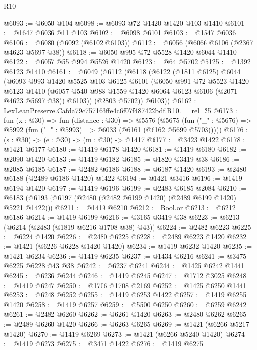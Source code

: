 \begin{lexlean}{R10}
\begin{coremodule}
@6093 := @6050 @104
@6098 := @6093 @72 @1420 @1420 @103 @1410
@6101 := @1647 @6036 @11 @103
@6102 := @6098 @6101
@6103 := @1547 @6036
@6106 := @6080 (@6092 (@6102 @6103))
@6112 := @6056 (@6066 @6106 (@2367 @4623 @5697 @38))
@6118 := @6050 @995 @72 @5528 @1420 @6044 @1410
@6122 := @6057 @55 @994 @5526 @1420
@6123 := @64 @5702
@6125 := @1392 @6123 @1410
@6161 := @6049
    (@6112
      (@6118
        (@6122
          (@1811 @6125)
          @6044
          (@6093
            @993
            @1420
            @5525
            @103
            @6125
            @6101
            (@6050
              @991
              @72
              @5523
              @1420
              @6123
              @1410
              (@6057 @540 @988 @1559 @1420 @6064 @6123 @6106 (@2071 @4623 @5697 @38))
              @6103))
          (@2803 @5702))
        @6103))
@6162 := LexLeanPreserve.Cafda79c757163ffe4c6f07f487422bdf.R10.__rel_25
@6173 := fun (x : @30) =>
  fun (distance : @30) =>
  @5576
    (@5675 (fun ("_" : @5676) => @5992 (fun ("_" : @5993) => @6033 (@6161 (@6162 @5699 @5703)))))
@6176 := (s : @30) -> (e : @30) -> (m : @30) -> @1417
@6177 := @3423 @1422
@6178 := @1421 @6177
@6180 := @1419 @6178 @1420
@6181 := @1419 @6180
@6182 := @2090 @1420
@6183 := @1419 @6182
@6185 := @1820 @3419 @38
@6186 := @2085 @6185
@6187 := @2482 @6186
@6188 := @6187 @1420
@6193 := @2480 @6188 (@2489 @6186 @1420) @1422
@6194 := @1421 @3416
@6196 := @1419 @6194 @1420
@6197 := @1419 @6196
@6199 := @2483 @6185 @2084
@6210 := @6183 (@6193 (@6197 (@2480 (@2482 @6199 @1420) (@2489 @6199 @1420) @5221 @1422)))
@6211 := @1419 @6210
@6212 := Bool.or
@6213 := @6212 @6186
@6214 := @1419 @6199
@6216 := @3165 @3419 @38
@6223 := @6213 (@6214 (@2483 (@1819 @6216 @1708 @38) @43))
@6224 := @2482 @6223
@6225 := @6224 @1420
@6226 := @2480 @6225
@6228 := @2489 @6223 @1420
@6232 := @1421 (@6226 @6228 @1420 @1420)
@6234 := @1419 @6232 @1420
@6235 := @1421 @6234
@6236 := @1419 @6235
@6237 := @1434 @6216
@6241 := @3475 @6225 @6228 @43 @38
@6242 := @6237 @6241
@6244 := @1425 @6242 @1441
@6245 := @6236 @6244
@6246 := @1419 @6245
@6247 := @1712 @3025
@6248 := @1419 @6247
@6250 := @1706 @1708 @2169
@6252 := @1425 @6250 @1441
@6253 := @6248 @6252
@6255 := @1419 @6253 @1422
@6257 := @1419 @6255 @1420
@6258 := @1419 @6257
@6259 := @5500 @6250
@6260 := @6259 @6242
@6261 := @2482 @6260
@6262 := @6261 @1420
@6263 := @2480 @6262
@6265 := @2489 @6260 @1420
@6266 := @6263 @6265
@6269 := @1421 (@6266 @5217 @1420)
@6270 := @1419 @6269
@6273 := @1421 (@6266 @5240 @1420)
@6274 := @1419 @6273
@6275 := @3471 @1422
@6276 := @1419 @6275

\end{coremodule}
\end{lexlean}
